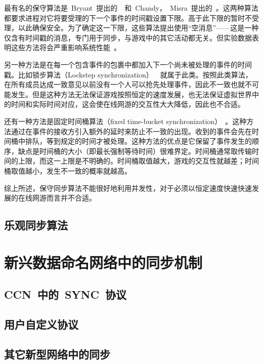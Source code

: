 最有名的保守算法是~Bryant~提出的~\cite{bryant}~和~Chandy，~Misra~提出的~\cite{chandy}。这两种算法都要求进程对它将要受理的下一个事件的时间戳设置下限。高于此下限的暂时不受理，以此确保安全。为了确定这一下限，这些算法提出使用“空消息”——这是一种仅含有时间戳的消息，专门用于同步，与游戏中的其它活动都无关。但实验数据表明这些方法将会严重影响系统性能~\cite{Ferretti2005}。

另一种方法是在每一个包含事件的包裹中都加入下一个尚未被处理的事件的时间戳。比如锁步算法（Lockstep synchronization）~\cite{lockstep}~就属于此类。按照此类算法，在所有成员达成一致意见以前没有一个人可以抢先处理事件，因此不一致也就不可能发生。但是这种方法无法保证游戏按照恒定的速度发展，也无法保证虚拟世界中的时间和实际时间对应，这会使在线网游的交互性大大降低，因此也不合适。

还有一种方法是固定时间桶算法（fixed time-bucket synchronization）~\cite{fixed-bucket}。这种方法通过在事件的接收方引入额外的延时来防止不一致的出现。收到的事件会先在时间桶中排队，等到规定的时间才被处理。这种方法的优点是它保留了事件发生的顺序，缺点是时间桶的大小（即最长强制等待时间）很难界定。时间桶通常取传输时间的上限，而这一上限是不明确的。时间桶取值越大，游戏的交互性就越差；时间桶取值越小，发生不一致的概率就越高。

综上所述，保守同步算法不能很好地利用并发性，对于必须以恒定速度快速快速发展的在线网游而言并不合适。

\subsection{乐观同步算法}
\label{optimistic}



\section{新兴数据命名网络中的同步机制}
\label{innovative}

\subsection{CCN~中的~SYNC~协议}

\subsection{用户自定义协议}

\subsection{其它新型网络中的同步}

